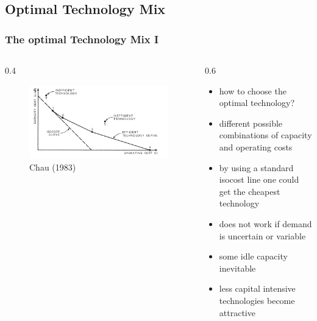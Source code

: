 \subsection{Optimal Technology Mix}

\begin{frame}

\frametitle{The optimal Technology Mix I}
\begin{columns}
\begin{column} {0.4\textwidth}

\begin{figure}[h]
\centering
\includegraphics[width=1.\textwidth]{capacity/technology_choice_chow}
    \caption{Chau (1983)}
    \label{fig:Daten 2004}            
\end{figure}
\end{column}

\begin{column} {0.6\textwidth}
\begin{itemize}
\item how to choose the optimal technology?
\item different possible combinations of capacity and operating costs
\item by using a standard isocost line one could get the cheapest technology
\item does not work if demand is uncertain or variable
\item some idle capacity inevitable
\item less capital intensive technologies become attractive
\end {itemize}

\end{column}
\end{columns}

\end{frame}			
